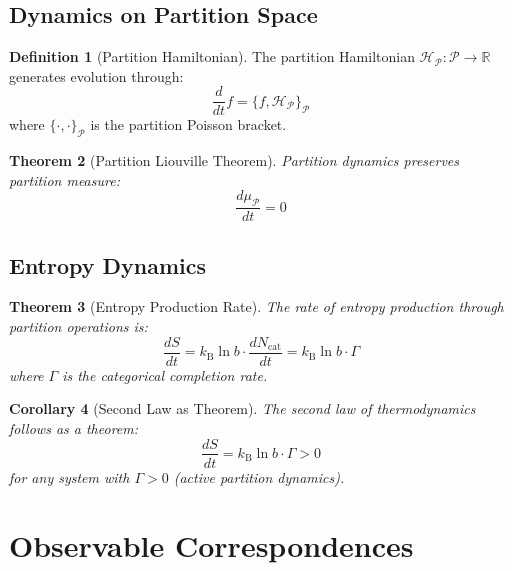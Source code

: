 \documentclass[twocolumn,10pt,a4paper]{article}
\newtheorem{theorem}{Theorem}[section]
\newtheorem{corollary}[theorem]{Corollary}
\theoremstyle{definition}
\newtheorem{definition}[theorem]{Definition}
\theoremstyle{remark}
\newcommand{\kB}{k_{\mathrm{B}}}
\newcommand{\Partition}{\mathcal{P}}
\newcommand{\Pspace}{\mathcal{P}}
\newcommand{\Real}{\mathbb{R}}
\begin{document}
\subsection{Dynamics on Partition Space}

\begin{definition}[Partition Hamiltonian]
\label{def:pham}
The partition Hamiltonian $\mathcal{H}_{\Partition}: \Pspace \to \Real$ generates evolution through:
\begin{equation}
    \frac{d}{dt}f = \{f, \mathcal{H}_{\Partition}\}_{\Partition}
\end{equation}
where $\{\cdot, \cdot\}_{\Partition}$ is the partition Poisson bracket.
\end{definition}

\begin{theorem}[Partition Liouville Theorem]
\label{thm:pliouville}
Partition dynamics preserves partition measure:
\begin{equation}
    \frac{d\mu_{\Partition}}{dt} = 0
\end{equation}
\end{theorem}

\subsection{Entropy Dynamics}

\begin{theorem}[Entropy Production Rate]
\label{thm:entropy_rate}
The rate of entropy production through partition operations is:
\begin{equation}
    \frac{dS}{dt} = \kB \ln b \cdot \frac{dN_{\text{cat}}}{dt} = \kB \ln b \cdot \Gamma
\end{equation}
where $\Gamma$ is the categorical completion rate.
\end{theorem}

\begin{corollary}[Second Law as Theorem]
\label{cor:second_law}
The second law of thermodynamics follows as a theorem:
\begin{equation}
    \frac{dS}{dt} = \kB \ln b \cdot \Gamma > 0
\end{equation}
for any system with $\Gamma > 0$ (active partition dynamics).
\end{corollary}

\section{Observable Correspondences}
\label{sec:correspondences}
\end{document}
